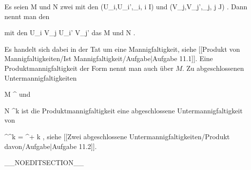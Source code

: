 \setcounter{section}{11}


{}
{

Es seien
\mathkor {} {M} {und} {N} {}
zwei
mit den
\mathkor {} {(U_i,U_i',\alpha_i, i \in I)} {und} {(V_j,V_j',\beta_j, j \in J)} {.}
Dann nennt man den

 mit den
 {U_i \times V_j } { U_i' \times V_j'
} {}
 {} {}
das 
\mathkor {} {M} {und} {N} {.}

}

Es handelt sich dabei in der Tat um eine Mannigfaltigkeit, siehe
[[Produkt von Mannigfaltigkeiten/Ist Mannigfaltigkeit/Aufgabe|Aufgabe 11.1]].
Eine Produktmannigfaltigkeit der Form
 nennt man auch  {} über $M$. Zu abgeschlossenen Untermannigfaltigkeiten

\mavergleichskette
{\vergleichskette
{ M
}
{ \subseteq }{ \R^\ell
}
{  }{
}
{    }{
}
{   }{
}
}
{}{}{}
und

\mavergleichskette
{\vergleichskette
{ N
}
{ \subseteq }{ \R^k
}
{  }{
}
{    }{
}
{   }{
}
}
{}{}{}
ist die Produktmannigfaltigkeit
 eine abgeschlossene Untermannigfaltigkeit von

\mavergleichskette
{\vergleichskette
{ \R^\ell \times \R^k
}
{ = }{ \R^{\ell + k}
}
{  }{
}
{    }{
}
{   }{
}
}
{}{}{,}
siehe
[[Zwei abgeschlossene Untermannigfaltigkeiten/Produkt davon/Aufgabe|Aufgabe 11.2]].

__NOEDITSECTION__

